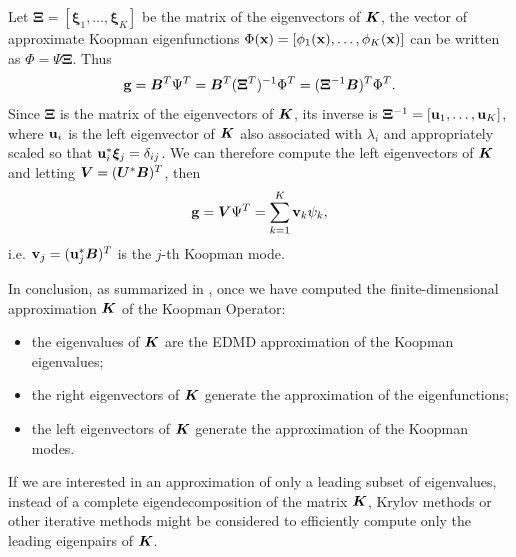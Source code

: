 Let $\bm{\Xi} = \left[\bm{\xi}_1,\dots,\bm{\xi}_K\right]$ be the matrix of the eigenvectors of $\vb*{K}$, the vector of approximate Koopman eigenfunctions $\Phi(\vb{x}) = \left[\phi_1(\vb{x}), \dots, \phi_K(\vb{x})\right]$ can be written as $\Phi = \Psi\bm{\Xi}$. Thus
\begin{equation}
    \vb{g} = \vb*{B}^T\Psi^T = \vb*{B}^T(\bm{\Xi}^T)^{-1}\Phi^T = (\bm{\Xi}^{-1}\vb*{B})^T\Phi^T.
\end{equation}
Since $\bm{\Xi}$ is the matrix of the eigenvectors of $\vb*{K}$, its inverse is $\bm{\Xi}^{-1} = \left[\vb{u}_1, \dots, \vb{u}_K\right]$, where $\vb{u}_i$ is the left eigenvector of $\vb*{K}$ also associated with $\lambda_i$ and appropriately scaled so that $\vb{u}_i^*\bm{\xi}_j = \delta_{ij}$. We can therefore compute the left eigenvectors of $\vb*{K}$ and letting  $\vb*{V} = (\vb*{U}^*\vb*{B})^T$, then
\begin{equation}
    \vb{g} = \vb*{V}\Psi^T = \sum_{k=1}^K \vb{v}_k\psi_k,
\end{equation}
i.e. $\vb{v}_j = (\vb{u}_j^*\vb*{B})^T$ is the $j$-th Koopman mode.

In conclusion, as summarized in ,  once we have computed the finite-dimensional approximation $\vb*{K}$ of the Koopman Operator:
\begin{itemize}
    \item the eigenvalues of $\vb*{K}$ are the EDMD approximation of the Koopman eigenvalues;
    \item the right eigenvectors of $\vb*{K}$ generate the approximation of the eigenfunctions;
    \item the left eigenvectors of $\vb*{K}$ generate the approximation of the Koopman modes.
\end{itemize}
If we are interested in an approximation of only a leading subset of eigenvalues, instead of a complete eigendecomposition of the matrix $\vb*{K}$, Krylov methods or other iterative methods might be considered to efficiently compute only the leading eigenpairs of $\vb*{K}$.

